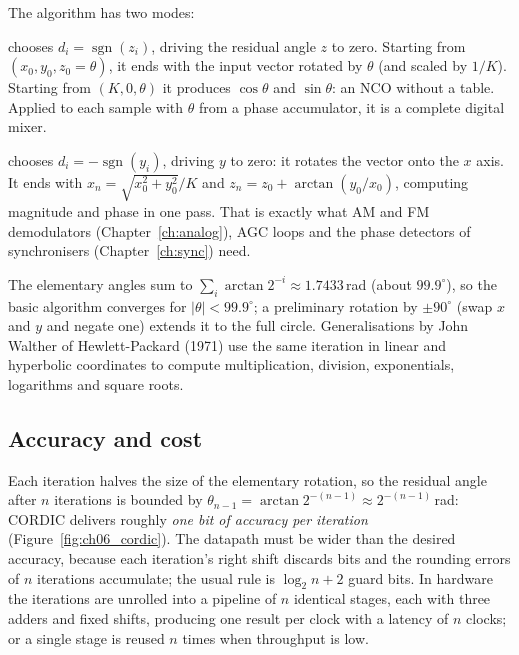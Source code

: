 The algorithm has two modes:
\begin{description}[style=nextline,leftmargin=1.2em,font=\sffamily\bfseries\small\color{navy}]
\item[Rotation mode] chooses $d_i=\operatorname{sgn}(z_i)$, driving the residual angle $z$ to zero.
Starting from $(x_0,y_0,z_0=\theta)$, it ends with the input vector rotated by $\theta$ (and scaled by
$1/K$). Starting from $(K,0,\theta)$ it produces $\cos\theta$ and $\sin\theta$: an NCO without a
table. Applied to each sample with $\theta$ from a phase accumulator, it is a complete digital mixer.
\item[Vectoring mode] chooses $d_i=-\operatorname{sgn}(y_i)$, driving $y$ to zero: it rotates the
vector onto the $x$ axis. It ends with $x_n=\sqrt{x_0^2+y_0^2}/K$ and $z_n=z_0+\arctan(y_0/x_0)$,
computing magnitude and phase in one pass. That is exactly what AM and FM demodulators
(Chapter~\ref{ch:analog}), AGC loops and the phase detectors of synchronisers (Chapter~\ref{ch:sync})
need.
\end{description}
The elementary angles sum to $\sum_i\arctan2^{-i}\approx1.7433$\,rad (about $99.9^\circ$), so the
basic algorithm converges for $|\theta|<99.9^\circ$; a preliminary rotation by $\pm90^\circ$ (swap
$x$ and $y$ and negate one) extends it to the full circle. Generalisations by John Walther of
Hewlett-Packard (1971) use the same iteration in linear and hyperbolic coordinates to compute
multiplication, division, exponentials, logarithms and square roots.


\subsection{Accuracy and cost}

Each iteration halves the size of the elementary rotation, so the residual angle after $n$
iterations is bounded by $\theta_{n-1}=\arctan2^{-(n-1)}\approx2^{-(n-1)}$\,rad: CORDIC delivers
roughly \emph{one bit of accuracy per iteration} (Figure~\ref{fig:ch06_cordic}). The datapath must be
wider than the desired accuracy, because each iteration's right shift discards bits and the rounding
errors of $n$ iterations accumulate; the usual rule is $\log_2n+2$ guard bits. In hardware the
iterations are unrolled into a pipeline of $n$ identical stages, each with three adders and fixed
shifts, producing one result per clock with a latency of $n$ clocks; or a single stage is reused
$n$ times when throughput is low.

